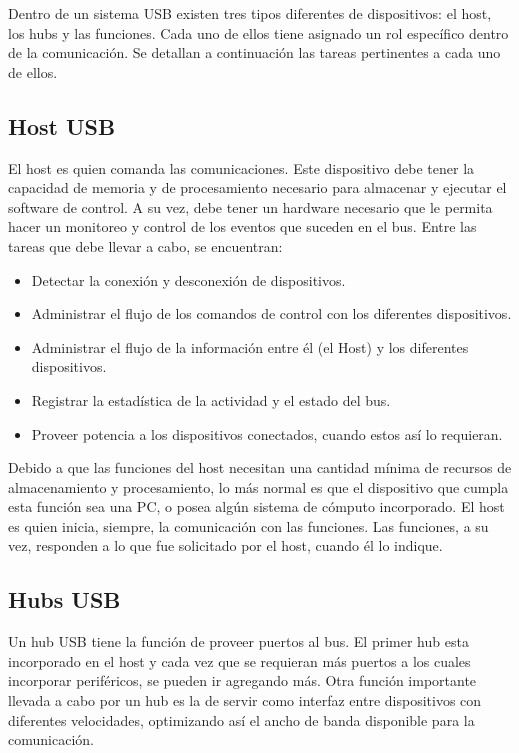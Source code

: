 Dentro de un sistema USB existen tres tipos diferentes de dispositivos: el host, los hubs y las funciones. Cada uno de ellos tiene asignado un rol específico dentro de la comunicación. Se detallan a continuación las tareas pertinentes a cada uno de ellos.\\

\subsection{Host USB}
	El host es quien comanda las comunicaciones. Este dispositivo debe tener la capacidad de memoria y de procesamiento necesario para almacenar y ejecutar el software de control. A su vez, debe tener un hardware necesario que le permita hacer un monitoreo y control de los eventos que suceden en el bus. Entre las tareas que debe llevar a cabo, se encuentran:
	
	\begin{itemize}
		\item Detectar la conexión y desconexión de dispositivos.
		\item Administrar el flujo de los comandos de control con los diferentes dispositivos.
		\item Administrar el flujo de la información entre él (el Host) y los diferentes dispositivos.
		\item Registrar la estadística de la actividad y el estado del bus.
		\item Proveer potencia a los dispositivos conectados, cuando estos así lo requieran.
	\end{itemize}
	
	Debido a que las funciones del host necesitan una cantidad mínima de recursos de almacenamiento y procesamiento, lo más normal es que el dispositivo que cumpla esta función sea una PC, o posea algún sistema de cómputo incorporado. El host es quien inicia, siempre, la comunicación con las funciones. Las funciones, a su vez, responden a lo que fue solicitado por el host, cuando él lo indique.\\
	
\subsection{Hubs USB}
	Un hub USB tiene la función de proveer puertos al bus. El primer hub esta incorporado en el host y cada vez que se requieran más puertos a los cuales incorporar periféricos, se pueden ir agregando más. Otra función importante llevada a cabo por un hub es la de servir como interfaz entre dispositivos con diferentes velocidades, optimizando así el ancho de banda disponible para la comunicación.\\
	
